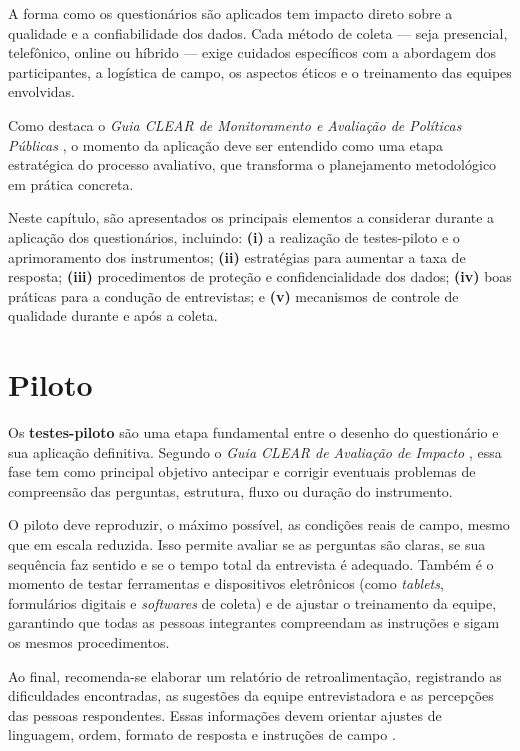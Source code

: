 \documentclass[12pt, a4paper, openany]{book}
\begin{document}
A forma como os question\'arios s\~ao aplicados tem impacto direto sobre a qualidade e a confiabilidade dos dados. Cada m\'etodo de coleta --- seja presencial, telef\^onico, online ou h\'ibrido --- exige cuidados espec\'ificos com a abordagem dos participantes, a log\'istica de campo, os aspectos \'eticos e o treinamento das equipes envolvidas.

Como destaca o \textit{Guia CLEAR de Monitoramento e Avalia\c{c}\~ao de Pol\'iticas P\'ublicas} \citep{fgvclear2025mea}, o momento da aplica\c{c}\~ao deve ser entendido como uma etapa estrat\'egica do processo avaliativo, que transforma o planejamento metodol\'ogico em pr\'atica concreta.

Neste cap\'itulo, s\~ao apresentados os principais elementos a considerar durante a aplica\c{c}\~ao dos question\'arios, incluindo: \textbf{(i)} a realiza\c{c}\~ao de testes-piloto e o aprimoramento dos instrumentos; \textbf{(ii)} estrat\'egias para aumentar a taxa de resposta; \textbf{(iii)} procedimentos de prote\c{c}\~ao e confidencialidade dos dados; \textbf{(iv)} boas pr\'aticas para a condu\c{c}\~ao de entrevistas; e \textbf{(v)} mecanismos de controle de qualidade durante e ap\'os a coleta.

\section{Piloto}

Os \textbf{testes-piloto} s\~ao uma etapa fundamental entre o desenho do question\'ario e sua aplica\c{c}\~ao definitiva. Segundo o \textit{Guia CLEAR de Avalia\c{c}\~ao de Impacto} \citep{fgvclear2025ai}, essa fase tem como principal objetivo antecipar e corrigir eventuais problemas de compreens\~ao das perguntas, estrutura, fluxo ou dura\c{c}\~ao do instrumento.

O piloto deve reproduzir, o m\'aximo poss\'ivel, as condi\c{c}\~oes reais de campo, mesmo que em escala reduzida. Isso permite avaliar se as perguntas s\~ao claras, se sua sequ\^encia faz sentido e se o tempo total da entrevista \'e adequado. Tamb\'em \'e o momento de testar ferramentas e dispositivos eletr\^onicos (como \textit{tablets}, formul\'arios digitais e \textit{softwares} de coleta) e de ajustar o treinamento da equipe, garantindo que todas as pessoas integrantes compreendam as instru\c{c}\~oes e sigam os mesmos procedimentos.

Ao final, recomenda-se elaborar um relat\'orio de retroalimenta\c{c}\~ao, registrando as dificuldades encontradas, as sugest\~oes da equipe entrevistadora e as percep\c{c}\~oes das pessoas respondentes. Essas informa\c{c}\~oes devem orientar ajustes de linguagem, ordem, formato de resposta e instru\c{c}\~oes de campo \citep{iarossi2006power, oecd2022data, fgvclear2025mea}.
\end{document}
